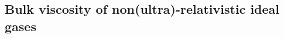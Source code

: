 \documentclass[useAMS,usenatbib,prd,twocolumn,nofootinbib]{revtex4-1}
\begin{document}
%
%

\subsection{Bulk viscosity of non(ultra)-relativistic ideal gases}\label{staiqui}
\end{document}
